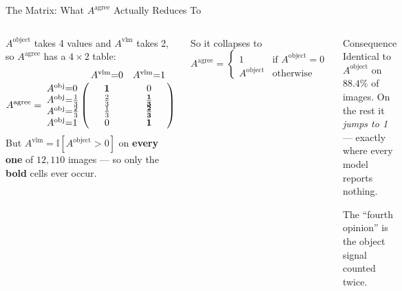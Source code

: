 \documentclass[aspectratio=169,11pt]{beamer}
\begin{document}
\begin{frame}{The Matrix: What $A^{\text{agree}}$ Actually Reduces To}
\begin{columns}[T]
\small
$A^{\text{object}}$ takes 4 values and $A^{\text{vlm}}$ takes 2, so $A^{\text{agree}}$ has a $4\times2$ table:
\vspace{1mm}
\[
A^{\text{agree}} =
\bordermatrix{
 & A^{\text{vlm}}{=}0 & A^{\text{vlm}}{=}1 \cr
A^{\text{obj}}{=}0        & \mathbf{1}    & 0 \cr
A^{\text{obj}}{=}\tfrac13 & \tfrac23      & \mathbf{\tfrac13} \cr
A^{\text{obj}}{=}\tfrac23 & \tfrac13      & \mathbf{\tfrac23} \cr
A^{\text{obj}}{=}1        & 0             & \mathbf{1} \cr}
\]
\vspace{1mm}
But $A^{\text{vlm}} = \mathbb{I}[A^{\text{object}}>0]$ on \textbf{every one} of $12{,}110$ images --- so only the \textbf{bold} cells ever occur.

\begin{block}{\small So it collapses to}
\footnotesize
\[
A^{\text{agree}} =
\begin{cases}
1 & \text{if } A^{\text{object}} = 0\\[1mm]
A^{\text{object}} & \text{otherwise}
\end{cases}
\]
\end{block}
\vspace{1mm}
\begin{alertblock}{\small Consequence}
\footnotesize Identical to $A^{\text{object}}$ on $\mathbf{88.4\%}$ of images. On the rest it \emph{jumps to 1} --- exactly where every model reports nothing.
\vspace{1mm}

The ``fourth opinion'' is the object signal counted twice.
\end{alertblock}
\end{columns}
\end{frame}
\end{document}
